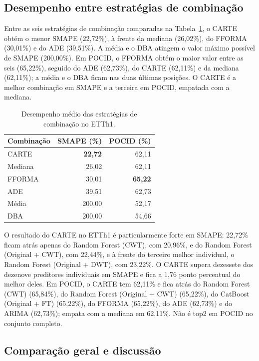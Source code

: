 \subsection{Desempenho entre estratégias de combinação}

Entre as seis estratégias de combinação comparadas na Tabela~\ref{tab:etth1-estaticas}, o CARTE obtém o menor SMAPE (22,72\%), à frente da mediana (26,02\%), do FFORMA (30,01\%) e do ADE (39,51\%). A média e o DBA atingem o valor máximo possível de SMAPE (200,00\%). Em POCID, o FFORMA obtém o maior valor entre as seis (65,22\%), seguido do ADE (62,73\%), do CARTE (62,11\%) e da mediana (62,11\%); a média e o DBA ficam nas duas últimas posições. O CARTE é a melhor combinação em SMAPE e a terceira em POCID, empatada com a mediana.

\begin{table}[H]
\small
\centering
\caption{Desempenho médio das estratégias de combinação no ETTh1.}
\label{tab:etth1-estaticas}
\begin{tabular}{@{}lrr@{}}
\toprule
\textbf{Combinação} & \textbf{SMAPE (\%)} & \textbf{POCID (\%)} \\
\midrule
CARTE   & \textbf{22,72} & 62,11 \\
Mediana & 26,02 & 62,11 \\
FFORMA  & 30,01 & \textbf{65,22} \\
ADE     & 39,51 & 62,73 \\
Média   & 200,00 & 52,17 \\
DBA     & 200,00 & 54,66 \\
\bottomrule
\end{tabular}
\end{table}

O resultado do CARTE no ETTh1 é particularmente forte em SMAPE: 22,72\% ficam atrás apenas do Random Forest (CWT), com 20,96\%, e do Random Forest (Original + CWT), com 22,44\%, e à frente do terceiro melhor individual, o Random Forest (Original + DWT), com 23,22\%. O CARTE supera dezessete dos dezenove preditores individuais em SMAPE e fica a 1,76 ponto percentual do melhor deles. Em POCID, o CARTE tem 62,11\% e fica atrás do Random Forest (CWT) (65,84\%), do Random Forest (Original + CWT) (65,22\%), do CatBoost (Original + FT) (65,22\%), do FFORMA (65,22\%), do ADE (62,73\%) e do ARIMA (62,73\%); empata com a mediana em 62,11\%. Não é top2 em POCID no conjunto completo.

\subsection{Comparação geral e discussão} \label{subsec:etth1-discussao}

